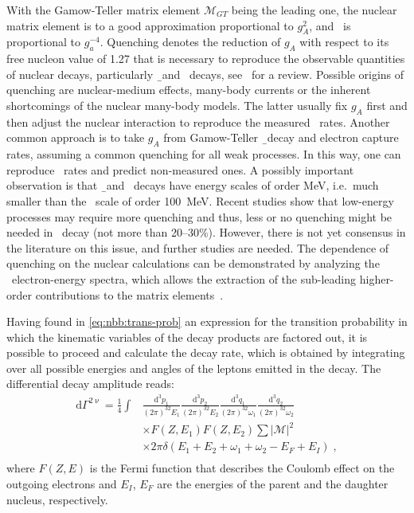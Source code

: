 With the Gamow-Teller matrix element $\mathcal{M}_{GT}$ being the leading one, the nuclear
matrix element is to a good approximation proportional to $g_A^2$, and \thalftwo\ is
proportional to $g_a^{-4}$. Quenching denotes the reduction of $g_A$ with respect to its
free nucleon value of 1.27 that is necessary to reproduce the observable quantities of
nuclear decays, particularly \b\ and \nnbb\ decays, see~\cite{Suhonen2017} for a review.
Possible origins of quenching are nuclear-medium effects, many-body currents or the
inherent shortcomings of the nuclear many-body models. The latter usually fix $g_A$ first
and then adjust the nuclear interaction to reproduce the measured \nnbb\ rates. Another
common approach is to take $g_A$ from Gamow-Teller \b\ decay and electron capture rates,
assuming a common quenching for all weak processes. In this way, one can reproduce \nnbb\
rates and predict non-measured ones. A possibly important observation is that \b\ and
\nnbb\ decays have energy scales of order MeV, i.e.~much smaller than the \onbb\ scale of
order 100~MeV. Recent studies show that low-energy processes may require more quenching
and thus, less or no quenching might be needed in \onbb\ decay (not more than 20--30\%).
However, there is not yet consensus in the literature on this issue, and further studies
are needed. The dependence of quenching on the nuclear calculations can be demonstrated by
analyzing the \nnbb\ electron-energy spectra, which allows the extraction of the
sub-leading higher-order contributions to the matrix elements~\cite{Gando2019}.

Having found in \cref{eq:nbb:trans-prob} an expression for the transition probability in
which the kinematic variables of the decay products are factored out, it is possible to
proceed and calculate the decay rate, which is obtained by integrating over all possible
energies and angles of the leptons emitted in the decay.  The differential decay amplitude
reads:
\[
  \begin{split}
    \text{d}\Gamma^{2\upnu} =
      \frac{1}{4} \int & \frac{\text{d}^3p_1}{(2\pi)^32E_1}
                         \frac{\text{d}^3p_2}{(2\pi)^32E_2}
                         \frac{\text{d}^3q_1}{(2\pi)^32\omega_1}
                         \frac{\text{d}^3q_2}{(2\pi)^32\omega_2} \\
                       & \times F(Z,E_1) F(Z,E_2) \sum |\mathcal{M}|^2 \\
                       & \times 2\pi\delta (E_1 + E_2 + \omega_1 +
                         \omega_2 - E_F + E_I) \;, \\
  \end{split}
\]
where $F(Z,E)$ is the Fermi function that describes the Coulomb effect on the
outgoing electrons and $E_I$, $E_F$ are the energies of the parent and the
daughter nucleus, respectively.

